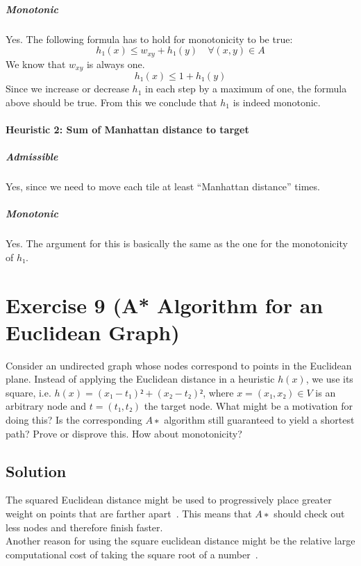 \documentclass[a4paper, 12pt]{report}
\begin{document}
\subparagraph{Monotonic}

Yes. The following formula has to hold for monotonicity to be true:
\[
    h₁(x) ≤ w_{xy} + h₁(y) \quad ∀(x,y) ∈ A
\]
We know that $w_{xy}$ is always one.
\[
    h₁(x) ≤ 1 + h₁(y)
\]
Since we increase or decrease $h_1$ in each step by a maximum of one, the
formula above should be true. From this we conclude that $h_1$ is indeed
monotonic.

\paragraph{Heuristic 2: Sum of Manhattan distance to target}

\subparagraph{Admissible}

Yes, since we need to move each tile at least “Manhattan distance” times.

\subparagraph{Monotonic}

Yes. The argument for this is basically the same as the one for the
monotonicity of $h₁$.

\section{Exercise 9 (A* Algorithm for an Euclidean Graph)}

Consider an undirected graph whose nodes correspond to points in the Euclidean
plane. Instead of applying the Euclidean distance in a heuristic $h(x)$, we use
its square, i.e. $h(x) = (x₁ − t₁)² + (x₂ − t₂)²$, where $x = (x₁, x₂) ∈ V$ is
an arbitrary node and $t = (t₁, t₂)$ the target node. What might be a
motivation for doing this? Is the corresponding $A∗$ algorithm still guaranteed
to yield a shortest path? Prove or disprove this. How about monotonicity?

\subsection{Solution}

The squared Euclidean distance might be used to progressively place greater
weight on points that are farther apart~\cite{Wikipedia_Euclidean_Distance}.
This means that $A∗$ should check out less nodes and therefore finish faster.\\

Another reason for using the square euclidean distance might be the relative
large computational cost of taking the square root of a
number~\cite{Amit_A_Star}.\\
\end{document}
